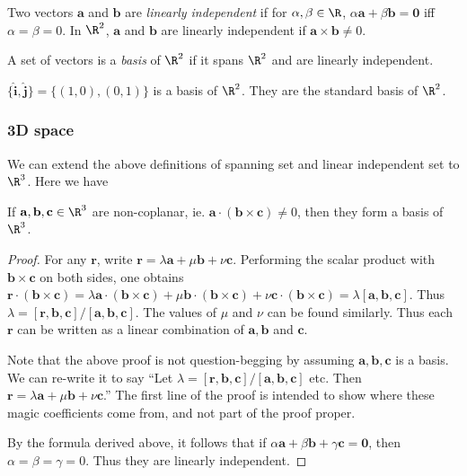 \documentclass[a4paper]{article}
\begin{document}
\begin{defi}
  Two vectors $\mathbf{a}$ and $\mathbf{b}$ are \emph{linearly independent} if for $\alpha, \beta\in \R$, $\alpha\mathbf{a} + \beta\mathbf{b} = \mathbf{0}$ iff $\alpha = \beta = 0$. In $\R^2$, $\mathbf{a}$ and $\mathbf{b}$ are linearly independent if $\mathbf{a\times b} \not= 0$.
\end{defi}

\begin{defi}[Basis of $\R^2$]
  A set of vectors is a \emph{basis} of $\R^2$ if it spans $\R^2$ and are linearly independent.
\end{defi}

\begin{eg}
  $\{\hat{\mathbf{i}}, \hat{\mathbf{j}}\} = \{(1, 0), (0, 1)\}$ is a basis of $\R^2$. They are the standard basis of $\R^2$.
\end{eg}

\subsubsection{3D space}
We can extend the above definitions of spanning set and linear independent set to $\R^3$. Here we have
\begin{thm}
  If $\mathbf{a, b, c}\in\R^3$ are non-coplanar, ie. $\mathbf{a\cdot(b\times c)}\not= 0$, then they form a basis of $\R^3$.
\end{thm}

\begin{proof}
  For any $\mathbf{r}$, write $\mathbf{r} = \lambda\mathbf{a} + \mu\mathbf{b} + \nu\mathbf{c}$. Performing the scalar product with $\mathbf{b\times c}$ on both sides, one obtains $\mathbf{r\cdot(b\times c)} = \lambda \mathbf{a\cdot(b\times c)} + \mu\mathbf{b\cdot (b\times c)} + \nu\mathbf{c\cdot(b\times c)} = \lambda \mathbf{[a, b, c]}$. Thus $\lambda = \mathbf{[r, b, c]/[a,b, c]}$. The values of $\mu$ and $\nu$ can be found similarly. Thus each $\mathbf{r}$ can be written as a linear combination of $\mathbf{a, b}$ and $\mathbf{c}$.

  Note that the above proof is not question-begging by assuming $\mathbf{a, b, c}$ is a basis. We can re-write it to say ``Let $\lambda = \mathbf{[r, b, c]/[a,b, c]}$ etc. Then $\mathbf{r} = \lambda\mathbf{a} + \mu\mathbf{b} + \nu\mathbf{c}$.'' The first line of the proof is intended to show where these magic coefficients come from, and not part of the proof proper.

  By the formula derived above, it follows that if $\alpha\mathbf{a} + \beta\mathbf{b} + \gamma\mathbf{c} = \mathbf{0}$, then $\alpha = \beta = \gamma = 0$. Thus they are linearly independent.
\end{proof}
\end{document}
